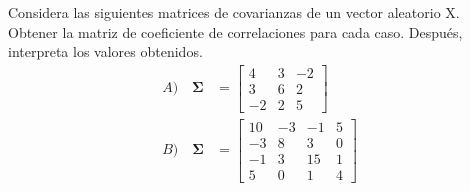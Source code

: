\begin{problem}{1}
Considera las siguientes matrices de covarianzas de un vector aleatorio X. Obtener la matriz de coeficiente de correlaciones para cada caso. Después, interpreta los valores obtenidos.
\begin{align*}
A) \quad \mathbf{\Sigma} &=
\begin{bmatrix}
4&3&-2\\
3&6&2\\
-2&2&5
\end{bmatrix}\\
B) \quad \mathbf{\Sigma} &=
\begin{bmatrix}
10&-3&-1&5\\
-3&8&3&0\\
-1&3&15&1\\
5&0&1&4
\end{bmatrix}
\end{align*}

\end{problem}
